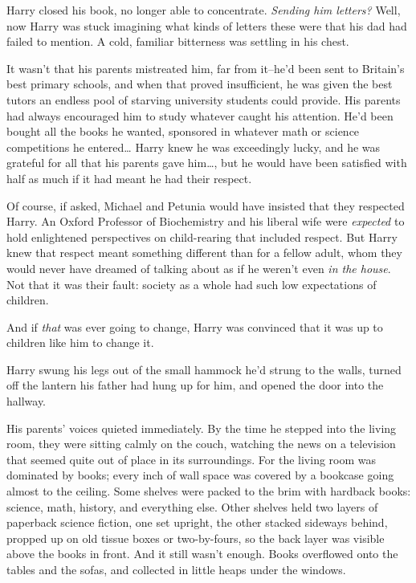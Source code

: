 Harry closed his book, no longer able to concentrate. \emph{Sending him letters?} Well, now Harry was stuck imagining what kinds of letters these were that his dad had failed to mention. A cold, familiar bitterness was settling in his chest.

It wasn't that his parents mistreated him, far from it\---he'd been sent to Britain's best primary schools, and when that proved insufficient, he was given the best tutors an endless pool of starving university students could provide. His parents had always encouraged him to study whatever caught his attention. He'd been bought all the books he wanted, sponsored in whatever math or science competitions he entered{\ldots} Harry knew he was exceedingly lucky, and he was grateful for all that his parents gave him{\ldots}, but he would have been satisfied with half as much if it had meant he had their respect.

Of course, if asked, Michael and Petunia would have insisted that they respected Harry. An Oxford Professor of Biochemistry and his liberal wife were \emph{expected} to hold enlightened perspectives on child-rearing that included respect. But Harry knew that respect meant something different than for a fellow adult, whom they would never have dreamed of talking about as if he weren't even \emph{in the house}. Not that it was their fault: society as a whole had such low expectations of children.

And if \emph{that} was ever going to change, Harry was convinced that it was up to children like him to change it.

Harry swung his legs out of the small hammock he'd strung to the walls, turned off the lantern his father had hung up for him, and opened the door into the hallway.

His parents' voices quieted immediately. By the time he stepped into the living room, they were sitting calmly on the couch, watching the news on a television that seemed quite out of place in its surroundings. For the living room was dominated by books; every inch of wall space was covered by a bookcase going almost to the ceiling. Some shelves were packed to the brim with hardback books: science, math, history, and everything else. Other shelves held two layers of paperback science fiction, one set upright, the other stacked sideways behind, propped up on old tissue boxes or two-by-fours, so the back layer was visible above the books in front. And it still wasn't enough. Books overflowed onto the tables and the sofas, and collected in little heaps under the windows.

